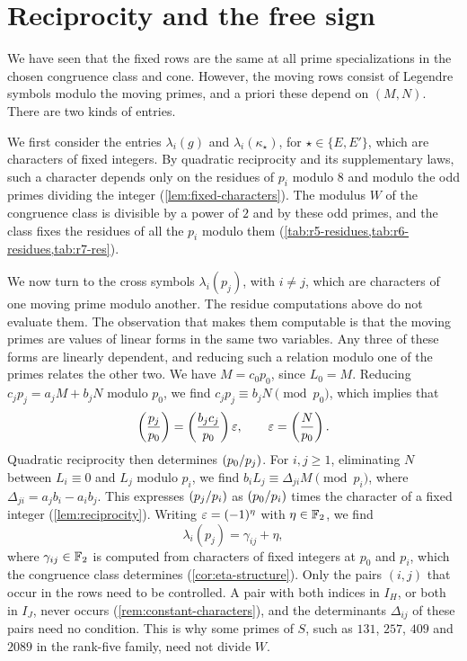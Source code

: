 \section{Reciprocity and the free sign}\label{sec:overview-sign}

We have seen that the fixed rows are the same at all prime specializations in the chosen congruence class and cone. However, the moving rows consist of Legendre symbols modulo the moving primes, and a priori these depend on $(M,N)$. There are two kinds of entries.

We first consider the entries $\lambda_i(g)$ and $\lambda_i(\kappa_\star)$, for $\star\in\{E,E'\}$, which are characters of fixed integers. By quadratic reciprocity and its supplementary laws, such a character depends only on the residues of $p_i$ modulo $8$ and modulo the odd primes dividing the integer (\cref{lem:fixed-characters}). The modulus $W$ of the congruence class is divisible by a power of $2$ and by these odd primes, and the class fixes the residues of all the $p_i$ modulo them (\cref{tab:r5-residues,tab:r6-residues,tab:r7-res}).

We now turn to the cross symbols $\lambda_i(p_j)$, with $i\ne j$, which are characters of one moving prime modulo another. The residue computations above do not evaluate them. The observation that makes them computable is that the moving primes are values of linear forms in the same two variables. Any three of these forms are linearly dependent, and reducing such a relation modulo one of the primes relates the other two. We have $M=c_0p_0$, since $L_0=M$. Reducing $c_jp_j=a_jM+b_jN$ modulo $p_0$, we find $c_jp_j\equiv b_jN\pmod{p_0}$, which implies that
\begin{equation*}
\leg{p_j}{p_0}=\leg{b_jc_j}{p_0}\eps,\qquad\eps=\leg N{p_0}.
\end{equation*}
Quadratic reciprocity then determines $\leg{p_0}{p_j}$.
For $i,j\ge1$, eliminating $N$ between $L_i\equiv0$ and $L_j$ modulo $p_i$, we find $b_iL_j\equiv\Delta_{ji}M\pmod{p_i}$, where $\Delta_{ji}=a_jb_i-a_ib_j$. This expresses $\leg{p_j}{p_i}$ as $\leg{p_0}{p_i}$ times the character of a fixed integer (\cref{lem:reciprocity}). Writing $\varepsilon=(-1)^\eta$ with $\eta\in\mathbb F_2$, we find
\begin{equation*}
\lambda_i(p_j)=\gamma_{ij}+\eta,
\end{equation*}
where $\gamma_{ij}\in\mathbb F_2$ is computed from characters of fixed integers at $p_0$ and $p_i$, which the congruence class determines (\cref{cor:eta-structure}). Only the pairs $(i,j)$ that occur in the rows need to be controlled. A pair with both indices in $I_H$, or both in $I_J$, never occurs (\cref{rem:constant-characters}), and the determinants $\Delta_{ij}$ of these pairs need no condition. This is why some primes of $S$, such as $131$, $257$, $409$ and $2089$ in the rank-five family, need not divide $W$.

